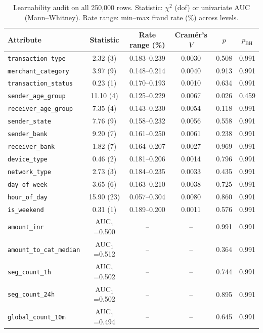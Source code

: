 \documentclass[conference]{IEEEtran}
\begin{document}
\begin{table}[t]
\centering
\caption{Learnability audit on all 250,000 rows. Statistic: $\chi^2$ (dof) or univariate AUC (Mann--Whitney). Rate range: min--max fraud rate (\%) across levels.}\label{tab:audit}
\footnotesize
\begin{tabular}{@{}lccccc@{}}
\toprule
Attribute & Statistic & Rate range (\%) & Cram\'er's $V$ & $p$ & $p_{\text{BH}}$ \\
\midrule
\texttt{transaction\_type} & 2.32 (3) & 0.183--0.239 & 0.0030 & 0.508 & 0.991 \\
\texttt{merchant\_category} & 3.97 (9) & 0.148--0.214 & 0.0040 & 0.913 & 0.991 \\
\texttt{transaction\_status} & 0.23 (1) & 0.170--0.193 & 0.0010 & 0.634 & 0.991 \\
\texttt{sender\_age\_group} & 11.10 (4) & 0.125--0.229 & 0.0067 & 0.026 & 0.459 \\
\texttt{receiver\_age\_group} & 7.35 (4) & 0.143--0.230 & 0.0054 & 0.118 & 0.991 \\
\texttt{sender\_state} & 7.76 (9) & 0.158--0.232 & 0.0056 & 0.558 & 0.991 \\
\texttt{sender\_bank} & 9.20 (7) & 0.161--0.250 & 0.0061 & 0.238 & 0.991 \\
\texttt{receiver\_bank} & 1.82 (7) & 0.164--0.207 & 0.0027 & 0.969 & 0.991 \\
\texttt{device\_type} & 0.46 (2) & 0.181--0.206 & 0.0014 & 0.796 & 0.991 \\
\texttt{network\_type} & 2.73 (3) & 0.184--0.235 & 0.0033 & 0.435 & 0.991 \\
\texttt{day\_of\_week} & 3.65 (6) & 0.163--0.210 & 0.0038 & 0.725 & 0.991 \\
\texttt{hour\_of\_day} & 15.90 (23) & 0.057--0.304 & 0.0080 & 0.860 & 0.991 \\
\texttt{is\_weekend} & 0.31 (1) & 0.189--0.200 & 0.0011 & 0.576 & 0.991 \\
\texttt{amount\_inr} & AUC$_1$=0.500 & -- & -- & 0.991 & 0.991 \\
\texttt{amount\_to\_cat\_median} & AUC$_1$=0.512 & -- & -- & 0.364 & 0.991 \\
\texttt{seg\_count\_1h} & AUC$_1$=0.502 & -- & -- & 0.744 & 0.991 \\
\texttt{seg\_count\_24h} & AUC$_1$=0.502 & -- & -- & 0.895 & 0.991 \\
\texttt{global\_count\_10m} & AUC$_1$=0.494 & -- & -- & 0.645 & 0.991 \\
\bottomrule
\end{tabular}
\end{table}
\end{document}
